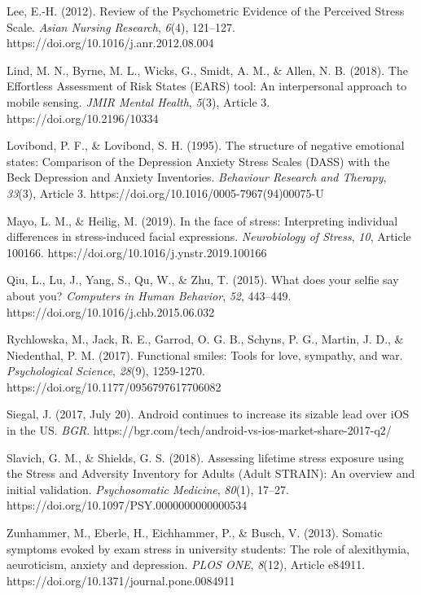 \documentclass[authordate, empirical]{jote-new-article}
\begin{document}
Lee, E.-H. (2012). Review of the Psychometric Evidence of the Perceived Stress Scale. \emph{Asian Nursing Research}, \emph{6}(4), 121--127. https://doi.org/10.1016/j.anr.2012.08.004

\balance

Lind, M. N., Byrne, M. L., Wicks, G., Smidt, A. M., \& Allen, N. B. (2018). The Effortless Assessment of Risk States (EARS) tool: An interpersonal approach to mobile sensing. \emph{JMIR Mental Health}, \emph{5}(3), Article 3. https://doi.org/10.2196/10334



Lovibond, P. F., \& Lovibond, S. H. (1995). The structure of negative emotional states: Comparison of the Depression Anxiety Stress Scales (DASS) with the Beck Depression and Anxiety Inventories. \emph{Behaviour Research and Therapy}, \emph{33}(3), Article 3. https://doi.org/10.1016/0005-7967(94)00075-U



Mayo, L. M., \& Heilig, M. (2019). In the face of stress: Interpreting individual differences in stress-induced facial expressions. \emph{Neurobiology of Stress}, \emph{10}, Article 100166. https://doi.org/10.1016/j.ynstr.2019.100166



Qiu, L., Lu, J., Yang, S., Qu, W., \& Zhu, T. (2015). What does your selfie say about you? \emph{Computers in Human Behavior}, \emph{52}, 443--449. https://doi.org/10.1016/j.chb.2015.06.032



Rychlowska, M., Jack, R. E., Garrod, O. G. B., Schyns, P. G., Martin, J. D., \& Niedenthal, P. M. (2017). Functional smiles: Tools for love, sympathy, and war. \emph{Psychological Science}, \emph{28}(9), 1259-1270. https://doi.org/10.1177/0956797617706082



Siegal, J. (2017, July 20). Android continues to increase its sizable lead over iOS in the US. \emph{BGR}. https://bgr.com/tech/android-vs-ios-market-share-2017-q2/



Slavich, G. M., \& Shields, G. S. (2018). Assessing lifetime stress exposure using the Stress and Adversity Inventory for Adults (Adult STRAIN): An overview and initial validation. \emph{Psychosomatic Medicine}, \emph{80}(1), 17--27. https://doi.org/10.1097/PSY.0000000000000534



Zunhammer, M., Eberle, H., Eichhammer, P., \& Busch, V. (2013). Somatic symptoms evoked by exam stress in university students: The role of alexithymia, aeuroticism, anxiety and depression. \emph{PLOS ONE}, \emph{8}(12), Article e84911. https://doi.org/10.1371/journal.pone.0084911
\end{document}
